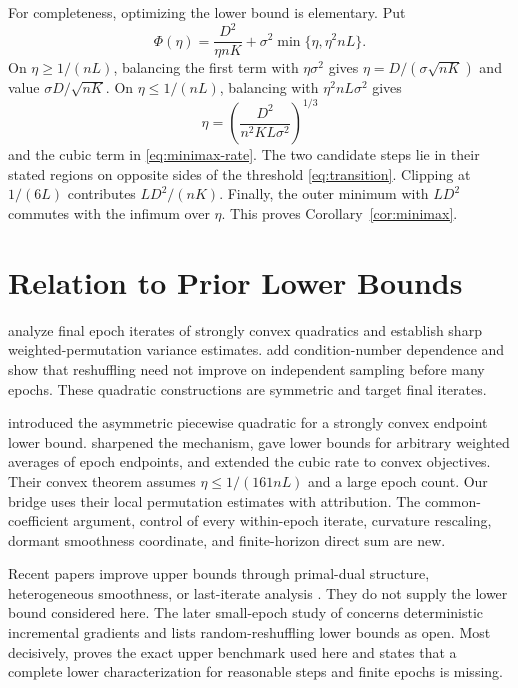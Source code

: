 \documentclass[twoside]{article}
\begin{document}
For completeness, optimizing the lower bound is elementary. Put \[ \Phi(\eta)=\frac{D^2}{\eta nK} +\sigma^2\min\{\eta,\eta^2nL\}. \] On $\eta\ge1/(nL)$, balancing the first term with $\eta\sigma^2$ gives $\eta=D/(\sigma\sqrt{nK})$ and value $\sigma D/\sqrt{nK}$. On $\eta\le1/(nL)$, balancing with $\eta^2nL\sigma^2$ gives
\begin{equation}
 \eta=\left(\frac{D^2}{n^2KL\sigma^2}\right)^{1/3}
 \label{eq:eta-cubic}
\end{equation}
and the cubic term in \eqref{eq:minimax-rate}. The two candidate steps lie in their stated regions on opposite sides of the threshold \eqref{eq:transition}. Clipping at $1/(6L)$ contributes $LD^2/(nK)$. Finally, the outer minimum with $LD^2$ commutes with the infimum over $\eta$. This proves Corollary~\ref{cor:minimax}.

\section{Relation to Prior Lower Bounds}
\label{sec:related}

\citet{safran2020good} analyze final epoch iterates of strongly convex quadratics and establish sharp weighted-permutation variance estimates. \citet{safran2021many} add condition-number dependence and show that reshuffling need not improve on independent sampling before many epochs. These quadratic constructions are symmetric and target final iterates.

\citet{rajput2020closing} introduced the asymmetric piecewise quadratic for a strongly convex endpoint lower bound. \citet{cha2023tighter} sharpened the mechanism, gave lower bounds for arbitrary weighted averages of epoch endpoints, and extended the cubic rate to convex objectives. Their convex theorem assumes $\eta\le1/(161nL)$ and a large epoch count. Our bridge uses their local permutation estimates with attribution. The common-coefficient argument, control of every within-epoch iterate, curvature rescaling, dormant smoothness coordinate, and finite-horizon direct sum are new.

Recent papers improve upper bounds through primal-dual structure, heterogeneous smoothness, or last-iterate analysis \citep{cai2024tighter,liu2024last}. They do not supply the lower bound considered here. The later small-epoch study of \citet{kim2025incremental} concerns deterministic incremental gradients and lists random-reshuffling lower bounds as open. Most decisively, \citet{liu2026dominates} proves the exact upper benchmark used here and states that a complete lower characterization for reasonable steps and finite epochs is missing.
\end{document}
